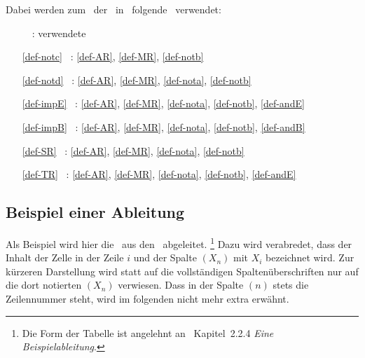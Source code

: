 {Dabei werden zum \Beweis\ der \Schlussregeln\ in~\cite{bib:Rautenberg} folgende \Basisregeln\ verwendet:
\begin{itemize}
	\renewcommand*{\itemindent}{3cm}
	\renewcommand*{\labelsep}{5pt}
	\item[\Schlussregel\ ~:] verwendete \Basisregeln
	\item[\ref{def-notc} ~:] \ref{def-AR}, \ref{def-MR}, \ref{def-notb}
	\item[\ref{def-notd} ~:] \ref{def-AR}, \ref{def-MR}, \ref{def-nota}, \ref{def-notb}
	\item[\ref{def-impE} ~:] \ref{def-AR}, \ref{def-MR}, \ref{def-nota}, \ref{def-notb}, \ref{def-andE}
	\item[\ref{def-impB} ~:] \ref{def-AR}, \ref{def-MR}, \ref{def-nota}, \ref{def-notb}, \ref{def-andB}
	\item[\ref{def-SR}   ~:] \ref{def-AR}, \ref{def-MR}, \ref{def-nota}, \ref{def-notb}
	\item[\ref{def-TR}   ~:] \ref{def-AR}, \ref{def-MR}, \ref{def-nota}, \ref{def-notb}, \ref{def-andE}
\end{itemize}
%
\subsection{Beispiel einer Ableitung}%
\label{sub-BeispielAbleitung}

Als Beispiel wird hier die \Schnittregel\ aus den \Basisregeln\ abgeleitet.%
\footnote{%
	Die Form der Tabelle ist angelehnt an~\cite{bib:NatuerlichesSchliessen} Kapitel~2.2.4 \emph{Eine Beispielableitung}.
}
Dazu wird verabredet, dass  der Inhalt der Zelle in der Zeile $i$ und der Spalte $(X_n)$ mit $X_i$ bezeichnet wird.
Zur kürzeren Darstellung wird statt auf die vollständigen Spaltenüberschriften nur auf die dort notierten $(X_n)$ verwiesen. Dass in der Spalte $(n)$ stets die Zeilennummer steht, wird im folgenden nicht mehr extra erwähnt.

}
